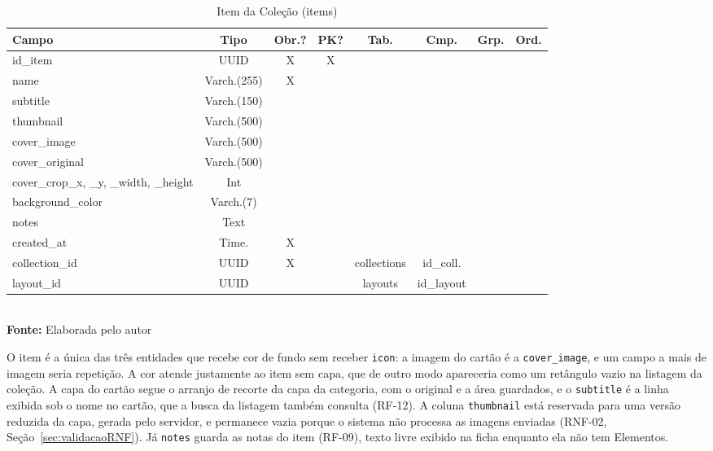 \FloatBarrier
\begin{table}[!htbp]
\centering
\caption{Item da Coleção (items)}
\footnotesize
\begin{tabularx}{\textwidth}{ | X | c | c | c | c | c | c | c | }
    \hline
    \textbf{Campo} & \textbf{Tipo} & \textbf{Obr.?} & \textbf{PK?} & \textbf{Tab.} & \textbf{Cmp.} & \textbf{Grp.} & \textbf{Ord.}\\ \hline
    id\_item & UUID & X & X &  &  &  &  \\ \hline
    name & Varch.(255) & X &  &  &  &  &  \\ \hline
    subtitle & Varch.(150) &  &  &  &  &  &  \\ \hline
    thumbnail & Varch.(500) &  &  &  &  &  &  \\ \hline
    cover\_image & Varch.(500) &  &  &  &  &  &  \\ \hline
    cover\_original & Varch.(500) &  &  &  &  &  &  \\ \hline
    cover\_crop\_x, \_y, \_width, \_height & Int &  &  &  &  &  &  \\ \hline
    background\_color & Varch.(7) &  &  &  &  &  &  \\ \hline
    notes & Text &  &  &  &  &  &  \\ \hline
    created\_at & Time. & X &  &  &  &  &  \\ \hline
    collection\_id & UUID & X &  & collections & id\_coll. &  &  \\ \hline
    layout\_id & UUID &  &  & layouts & id\_layout &  &  \\ \hline
\end{tabularx}
\vspace{0.1cm} \\ \textbf{Fonte:} Elaborada pelo autor
\label{tab:tabelaItemDetalhado}
\end{table}

O item é a única das três entidades que recebe cor de fundo sem receber \texttt{icon}: a imagem do
cartão é a \texttt{cover\_image}, e um campo a mais de imagem seria repetição. A cor atende
justamente ao item sem capa, que de outro modo apareceria como um retângulo vazio na listagem da
coleção. A capa do cartão segue o arranjo de recorte da capa da categoria, com o original e a área guardados, e o \texttt{subtitle} é a linha exibida sob o nome no cartão, que a busca da listagem também consulta (RF-12). A coluna \texttt{thumbnail} está reservada para uma versão reduzida da capa, gerada pelo servidor, e permanece vazia porque o sistema não processa as imagens enviadas (RNF-02, Seção~\ref{sec:validacaoRNF}). Já \texttt{notes} guarda as notas do item (RF-09), texto livre exibido na ficha enquanto ela não tem Elementos.


